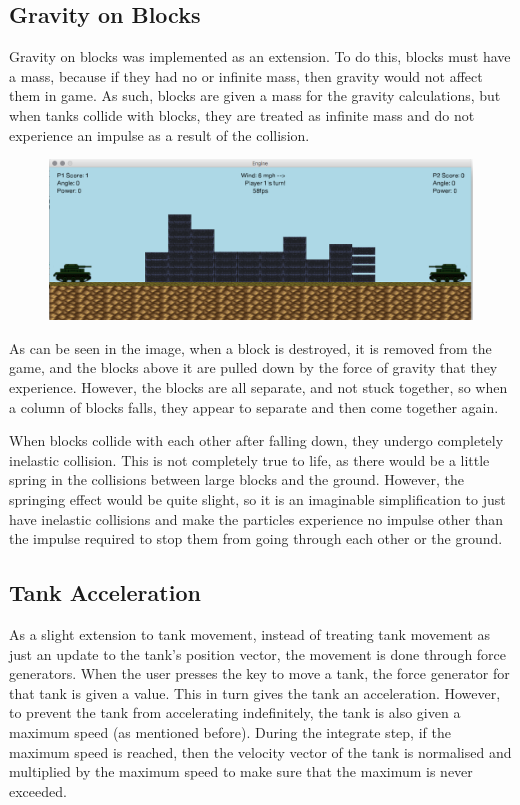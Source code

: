 \documentclass[12pt]{article}
\begin{document}
\subsection{Gravity on Blocks}
Gravity on blocks was implemented as an extension. To do this, blocks must have a mass, because if they had no or infinite mass, then gravity would not affect them in game. As such, blocks are given a mass for the gravity calculations, but when tanks collide with blocks, they are treated as infinite mass and do not experience an impulse as a result of the collision.
\begin{figure}[H]
\centerline{\includegraphics[width=17cm]{gravity}}
\end{figure}
As can be seen in the image, when a block is destroyed, it is removed from the game, and the blocks above it are pulled down by the force of gravity that they experience. However, the blocks are all separate, and not stuck together, so when a column of blocks falls, they appear to separate and then come together again.
\par 
When blocks collide with each other after falling down, they undergo completely inelastic collision. This is not completely true to life, as there would be a little spring in the collisions between large blocks and the ground. However, the springing effect would be quite slight, so it is an imaginable simplification to just have inelastic collisions and make the particles experience no impulse other than the impulse required to stop them from going through each other or the ground.
\subsection{Tank Acceleration}
As a slight extension to tank movement, instead of treating tank movement as just an update to the tank's position vector, the movement is done through force generators. When the user presses the key to move a tank, the force generator for that tank is given a value. This in turn gives the tank an acceleration. However, to prevent the tank from accelerating indefinitely, the tank is also given a maximum speed (as mentioned before). During the integrate step, if the maximum speed is reached, then the velocity vector of the tank is normalised and multiplied by the maximum speed to make sure that the maximum is never exceeded.
\end{document}
